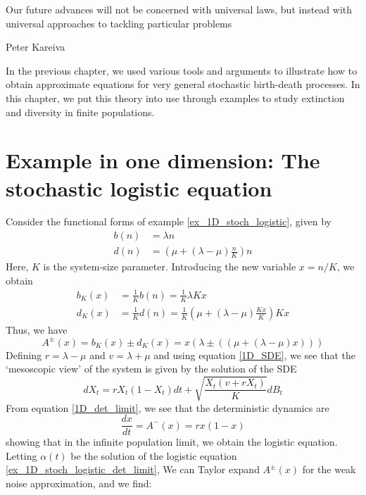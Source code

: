 \epigraph{\justifying Our future advances will not be concerned with universal laws, but instead with universal approaches to tackling particular problems}{Peter Kareiva}

In the previous chapter, we used various tools and arguments to illustrate how to obtain approximate equations for very general stochastic birth-death processes. In this chapter, we put this theory into use through examples to study extinction and diversity in finite populations.

\section{Example in one dimension: The stochastic logistic equation}
Consider the functional forms of example \ref{ex_1D_stoch_logistic}, given by
\begin{equation}
\label{ex_1D_stoch_logistic_BD_eqns}
\begin{aligned}
    b(n) &= \lambda n\\
    d(n) &= \left(\mu + (\lambda-\mu)\frac{n}{K}\right)n
\end{aligned}
\end{equation}
Here, $K$ is the system-size parameter. Introducing the new variable $x=n/K$, we obtain
\begin{align*}
    b_K(x) &= \frac{1}{K}b(n) = \frac{1}{K}\lambda Kx\\
    d_K(x) &= \frac{1}{K}d(n) = \frac{1}{K}\left(\mu + (\lambda-\mu)\frac{Kx}{K}\right)Kx
\end{align*}
Thus, we have
\begin{equation*}
    A^{\pm}(x) = b_K(x)\pm d_K(x) = x\left(\lambda \pm \left(\left(\mu + (\lambda-\mu)x\right)\right) \right)
\end{equation*}
Defining $r=\lambda-\mu$ and $v=\lambda+\mu$ and using equation \eqref{1D_SDE}, we 
see that the `mesoscopic view' of the system is given by the solution of the SDE
\begin{equation}\label{ex_1D_stoch_logistic_full_SDE}
dX_t =  rX_t(1-X_t)dt + \sqrt{\frac{X_t(v+rX_t)}{K}}dB_t
\end{equation}
From equation \eqref{1D_det_limit}, we see that the deterministic dynamics are
\begin{equation}\label{ex_1D_stoch_logistic_det_limit}
\frac{dx}{dt} = A^-(x) = rx(1-x)
\end{equation}
showing that in the infinite population limit, we
obtain the logistic equation. Letting $\alpha(t)$ be the solution of the logistic equation \eqref{ex_1D_stoch_logistic_det_limit}, We can Taylor expand $A^{\pm}(x)$ for the weak noise approximation, and we find:
